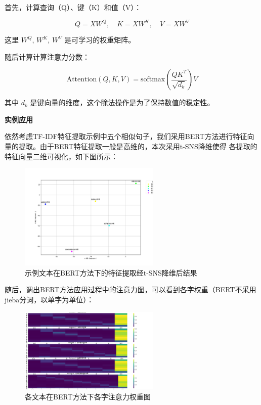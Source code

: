 \documentclass[UTF8,a4paper,15pt,titlepage,oneside]{ctexbook}
\begin{document}
首先，计算查询（Q）、键（K）和值（V）：

\begin{equation}
Q = XW^Q, \quad K = XW^K, \quad V = XW^V
\end{equation}

这里 \(W^Q\), \(W^K\), \(W^V\) 是可学习的权重矩阵。

随后计算计算注意力分数：

\begin{equation}
\text{Attention}(Q, K, V) = \text{softmax}\left(\frac{QK^T}{\sqrt{d_k}}\right)V
\end{equation}

其中 \(d_k\) 是键向量的维度，这个除法操作是为了保持数值的稳定性。

\vskip 0.2cm
\noindent
\textbf{实例应用}

依然考虑TF-IDF特征提取示例中五个相似句子，我们采用BERT方法进行特征向量的提取。由于BERT特征提取一般是高维的，本次采用t-SNS降维使得
各提取的特征向量二维可视化，如下图所示：

\begin{figure}[H]
  \centering
  \includegraphics[width=0.6\textwidth,keepaspectratio=false]{pictures/2.png} %
  \caption{示例文本在BERT方法下的特征提取经t-SNS降维后结果}
  \label{2}
\end{figure}

随后，调出BERT方法应用过程中的注意力图，可以看到各字权重（BERT不采用jieba分词，以单字为单位）：

\begin{figure}[H]
  \centering
  \includegraphics[width=0.6\textwidth,keepaspectratio=false]{pictures/3.png} %
  \caption{各文本在BERT方法下各字注意力权重图}
  
\end{figure}
\end{document}
